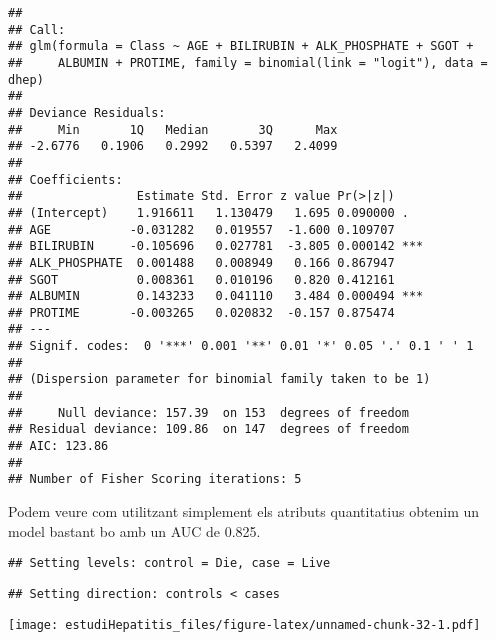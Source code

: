 \documentclass[]{article}
\newenvironment{Shaded}{\begin{snugshade}}{\end{snugshade}}
\newcommand{\DataTypeTok}[1]{\textcolor[rgb]{0.13,0.29,0.53}{#1}}
\newcommand{\KeywordTok}[1]{\textcolor[rgb]{0.13,0.29,0.53}{\textbf{#1}}}
\newcommand{\NormalTok}[1]{#1}
\newcommand{\OperatorTok}[1]{\textcolor[rgb]{0.81,0.36,0.00}{\textbf{#1}}}
\newcommand{\OtherTok}[1]{\textcolor[rgb]{0.56,0.35,0.01}{#1}}
\newcommand{\StringTok}[1]{\textcolor[rgb]{0.31,0.60,0.02}{#1}}
\begin{document}
\begin{verbatim}
## 
## Call:
## glm(formula = Class ~ AGE + BILIRUBIN + ALK_PHOSPHATE + SGOT + 
##     ALBUMIN + PROTIME, family = binomial(link = "logit"), data = dhep)
## 
## Deviance Residuals: 
##     Min       1Q   Median       3Q      Max  
## -2.6776   0.1906   0.2992   0.5397   2.4099  
## 
## Coefficients:
##                Estimate Std. Error z value Pr(>|z|)    
## (Intercept)    1.916611   1.130479   1.695 0.090000 .  
## AGE           -0.031282   0.019557  -1.600 0.109707    
## BILIRUBIN     -0.105696   0.027781  -3.805 0.000142 ***
## ALK_PHOSPHATE  0.001488   0.008949   0.166 0.867947    
## SGOT           0.008361   0.010196   0.820 0.412161    
## ALBUMIN        0.143233   0.041110   3.484 0.000494 ***
## PROTIME       -0.003265   0.020832  -0.157 0.875474    
## ---
## Signif. codes:  0 '***' 0.001 '**' 0.01 '*' 0.05 '.' 0.1 ' ' 1
## 
## (Dispersion parameter for binomial family taken to be 1)
## 
##     Null deviance: 157.39  on 153  degrees of freedom
## Residual deviance: 109.86  on 147  degrees of freedom
## AIC: 123.86
## 
## Number of Fisher Scoring iterations: 5
\end{verbatim}

Podem veure com utilitzant simplement els atributs quantitatius obtenim
un model bastant bo amb un AUC de 0.825.

\begin{Shaded}
\end{Shaded}

\begin{verbatim}
## Setting levels: control = Die, case = Live
\end{verbatim}

\begin{verbatim}
## Setting direction: controls < cases
\end{verbatim}

\texttt{[image: estudiHepatitis\_files/figure-latex/unnamed-chunk-32-1.pdf]}
\end{document}
